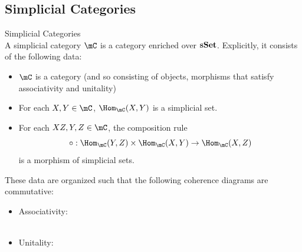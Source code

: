 \documentclass[a4paper]{article}
\begin{document}
\subsection{Simplicial Categories}
\begin{defn}{Simplicial Categories}{}\\ A simplicial category $\mC$ is a category enriched over $\bold{sSet}$. Explicitly, it consists of the following data: 
\begin{itemize}
\item $\mC$ is a category (and so consisting of objects, morphisms that satisfy associativity and unitality)
\item For each $X,Y\in\mC$, $\Hom_\mC(X,Y)$ is a simplicial set. 
\item For each $XZ,Y,Z\in\mC$, the composition rule $$\circ:\Hom_\mC(Y,Z)\times\Hom_\mC(X,Y)\to\Hom_\mC(X,Z)$$ is a morphism of simplicial sets. 
\end{itemize}
These data are organized such that the following coherence diagrams are commutative: 
\begin{itemize}
\item Associativity: \\
\\
\item Unitality: \\
\\
\end{itemize}
\end{defn}
\end{document}

